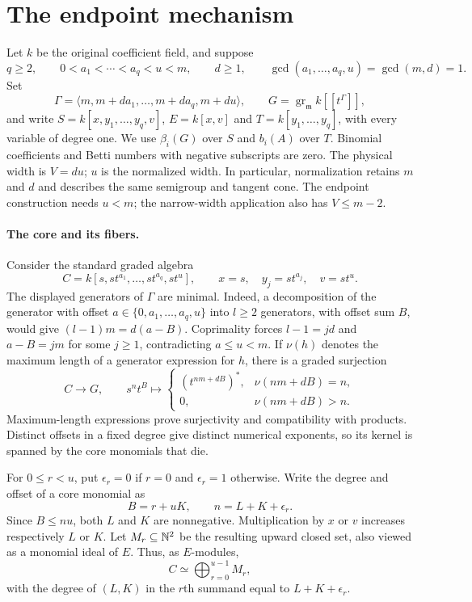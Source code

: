 \section{The endpoint mechanism}\label{sec:endpoint}

Let $k$ be the original coefficient field, and suppose
\[
 q\ge2,\qquad 0<a_1<\cdots<a_q<u<m,\qquad d\ge1,
 \qquad \gcd(a_1,\ldots,a_q,u)=\gcd(m,d)=1.
\]
Set
\[
 \Gamma=\langle m,m+da_1,\ldots,m+da_q,m+du\rangle,
 \qquad G=\operatorname{gr}_{\mathfrak m}k[[t^\Gamma]],
\]
and write $S=k[x,y_1,\ldots,y_q,v]$, $E=k[x,v]$ and
$T=k[y_1,\ldots,y_q]$, with every variable of degree one.
We use $\beta_i(G)$ over $S$ and $b_i(A)$ over $T$.
Binomial coefficients and Betti numbers with negative subscripts are zero.
The physical width is $V=du$; $u$ is the normalized width.
In particular, normalization retains $m$ and $d$ and describes the same
semigroup and tangent cone. The endpoint construction needs $u<m$;
the narrow-width application also has $V\le m-2$.

\paragraph{The core and its fibers.}
Consider the standard graded algebra
\[
 C=k[s,st^{a_1},\ldots,st^{a_q},st^u],
 \qquad x=s,\quad y_j=st^{a_j},\quad v=st^u.
\]
The displayed generators of $\Gamma$ are minimal. Indeed, a decomposition
of the generator with offset $a\in\{0,a_1,\ldots,a_q,u\}$ into
$l\ge2$ generators, with offset sum $B$, would give
$(l-1)m=d(a-B)$. Coprimality forces $l-1=jd$ and $a-B=jm$
for some $j\ge1$, contradicting $a\le u<m$.
If $\nu(h)$ denotes the maximum length of a generator expression for $h$,
there is a graded surjection
\begin{equation}\label{eq:endpoint-core-map}
 C\longrightarrow G,\qquad
 s^nt^B\longmapsto
 \begin{cases}(t^{nm+dB})^*,&\nu(nm+dB)=n,\\
 0,&\nu(nm+dB)>n.
 \end{cases}
\end{equation}
Maximum-length expressions prove surjectivity and compatibility with products.
Distinct offsets in a fixed degree give distinct numerical exponents, so
its kernel is spanned by the core monomials that die.

For $0\le r<u$, put $\epsilon_r=0$ if $r=0$ and $\epsilon_r=1$ otherwise.
Write the degree and offset of a core monomial as
\[
 B=r+uK,\qquad n=L+K+\epsilon_r.
\]
Since $B\le nu$, both $L$ and $K$ are nonnegative.
Multiplication by $x$ or $v$ increases respectively $L$ or $K$.
Let $M_r\subseteq\mathbb N^2$ be the resulting upward closed set, also viewed
as a monomial ideal of $E$. Thus, as $E$-modules,
\begin{equation}\label{eq:endpoint-fibers}
 C\simeq\bigoplus_{r=0}^{u-1}M_r,
\end{equation}
with the degree of $(L,K)$ in the $r$th summand equal to
$L+K+\epsilon_r$.

